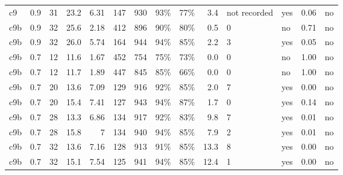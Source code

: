 \begin{landscape}
\begin{longtable}{llrrrrrrrrllll}
c9 & 0.9 & 31 & 23.2 & 6.31 & 147 & 930 & 93\% & 77\% & 3.4 & not recorded & yes & 0.06 & no \\
c9b & 0.9 & 32 & 25.6 & 2.18 & 412 & 896 & 90\% & 80\% & 0.5 & 0 & no & 0.71 & no \\
c9b & 0.9 & 32 & 26.0 & 5.74 & 164 & 944 & 94\% & 85\% & 2.2 & 3 & yes & 0.05 & no \\
c9b & 0.7 & 12 & 11.6 & 1.67 & 452 & 754 & 75\% & 73\% & 0.0 & 0 & no & 1.00 & no \\
c9b & 0.7 & 12 & 11.7 & 1.89 & 447 & 845 & 85\% & 66\% & 0.0 & 0 & no & 1.00 & no \\
c9b & 0.7 & 20 & 13.6 & 7.09 & 129 & 916 & 92\% & 85\% & 2.0 & 7 & yes & 0.00 & no \\
c9b & 0.7 & 20 & 15.4 & 7.41 & 127 & 943 & 94\% & 87\% & 1.7 & 0 & yes & 0.14 & no \\
c9b & 0.7 & 28 & 13.3 & 6.86 & 134 & 917 & 92\% & 83\% & 9.8 & 7 & yes & 0.01 & no \\
c9b & 0.7 & 28 & 15.8 & 7 & 134 & 940 & 94\% & 85\% & 7.9 & 2 & yes & 0.01 & no \\
c9b & 0.7 & 32 & 13.6 & 7.16 & 128 & 913 & 91\% & 85\% & 13.3 & 8 & yes & 0.00 & no \\
c9b & 0.7 & 32 & 15.1 & 7.54 & 125 & 941 & 94\% & 85\% & 12.4 & 1 & yes & 0.00 & no \\
\end{longtable}
\endgroup
\end{landscape}
\restoregeometry
